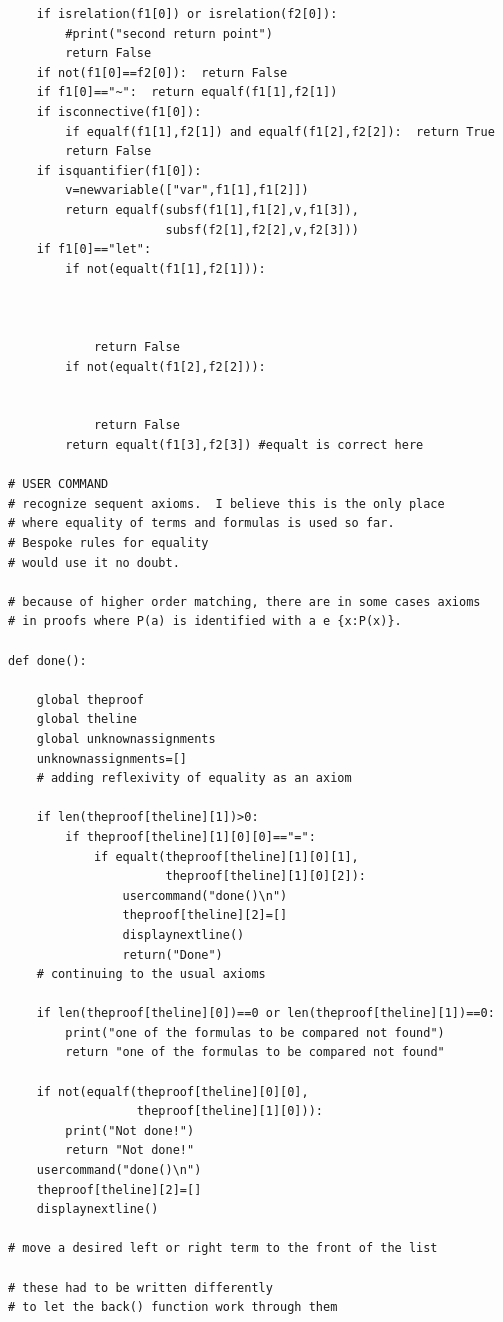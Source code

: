 \documentclass{article}
\begin{document}
\begin{verbatim}
    if isrelation(f1[0]) or isrelation(f2[0]):
        #print("second return point")
        return False
    if not(f1[0]==f2[0]):  return False
    if f1[0]=="~":  return equalf(f1[1],f2[1])
    if isconnective(f1[0]):
        if equalf(f1[1],f2[1]) and equalf(f1[2],f2[2]):  return True
        return False
    if isquantifier(f1[0]):
        v=newvariable(["var",f1[1],f1[2]])
        return equalf(subsf(f1[1],f1[2],v,f1[3]),
                      subsf(f2[1],f2[2],v,f2[3]))
    if f1[0]=="let":
        if not(equalt(f1[1],f2[1])):



            return False
        if not(equalt(f1[2],f2[2])):


            return False
        return equalt(f1[3],f2[3]) #equalt is correct here

# USER COMMAND
# recognize sequent axioms.  I believe this is the only place
# where equality of terms and formulas is used so far.  
# Bespoke rules for equality
# would use it no doubt.

# because of higher order matching, there are in some cases axioms
# in proofs where P(a) is identified with a e {x:P(x)}.

def done():
    
    global theproof
    global theline
    global unknownassignments
    unknownassignments=[]
    # adding reflexivity of equality as an axiom

    if len(theproof[theline][1])>0:
        if theproof[theline][1][0][0]=="=":
            if equalt(theproof[theline][1][0][1],
                      theproof[theline][1][0][2]):
                usercommand("done()\n")
                theproof[theline][2]=[]
                displaynextline()
                return("Done")
    # continuing to the usual axioms

    if len(theproof[theline][0])==0 or len(theproof[theline][1])==0:
        print("one of the formulas to be compared not found")
        return "one of the formulas to be compared not found"

    if not(equalf(theproof[theline][0][0],
                  theproof[theline][1][0])):
        print("Not done!")
        return "Not done!"
    usercommand("done()\n")
    theproof[theline][2]=[]
    displaynextline()

# move a desired left or right term to the front of the list

# these had to be written differently 
# to let the back() function work through them


\end{verbatim}
\end{document}
